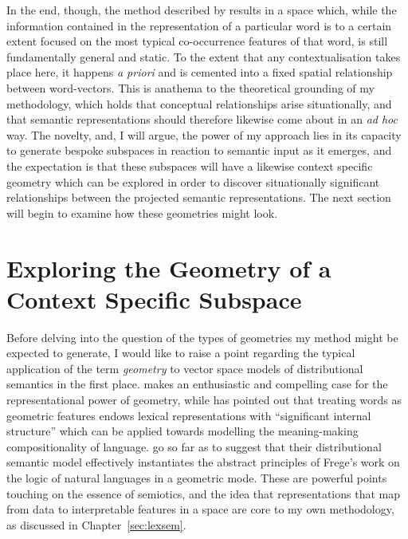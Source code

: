 In the end, though, the method described by \citeauthor{PolajnarEA2014} results in a space which, while the information contained in the representation of a particular word is to a certain extent focused on the most typical co-occurrence features of that word, is still fundamentally general and static.  To the extent that any contextualisation takes place here, it happens \emph{a priori} and is cemented into a fixed spatial relationship between word-vectors.  This is anathema to the theoretical grounding of my methodology, which holds that conceptual relationships arise situationally, and that semantic representations should therefore likewise come about in an \emph{ad hoc} way.  The novelty, and, I will argue, the power of my approach lies in its capacity to generate bespoke subspaces in reaction to semantic input as it emerges, and the expectation is that these subspaces will have a likewise context specific geometry which can be explored in order to discover situationally significant relationships between the projected semantic representations.  The next section will begin to examine how these geometries might look.

\section{Exploring the Geometry of a Context Specific Subspace} \label{sec:geotext}
Before delving into the question of the types of geometries my method might be expected to generate, I would like to raise a point regarding the typical application of the term \emph{geometry} to vector space models of distributional semantics in the first place.  \cite{Widdows2004} makes an enthusiastic and compelling case for the representational power of geometry, while \citeauthor{Clark2015} has pointed out that treating words as geometric features endows lexical representations with ``significant internal structure'' \citep[][p. 509]{Clark2015} which can be applied towards modelling the meaning-making compositionality of language.  \cite{BaroniEA2014b} go so far as to suggest that their distributional semantic model effectively instantiates the abstract principles of Frege's work on the logic of natural languages \citep{Dummett1981} in a geometric mode.  These are powerful points touching on the essence of semiotics, and the idea that representations that map from data to interpretable features in a space are core to my own methodology, as discussed in Chapter~\ref{sec:lexsem}.

